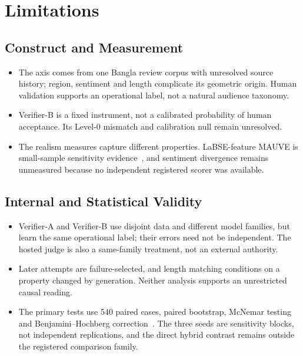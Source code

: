 \section{Limitations}
\label{sec:ch7-limitations}

\subsection{Construct and Measurement}
\label{sec:ch7-construct-measurement}

\begin{itemize}
    \setlength{\itemsep}{2pt}
    \setlength{\parskip}{0pt}
    \setlength{\parsep}{0pt}
    \item The axis comes from one Bangla review corpus with unresolved source history; region, sentiment and length complicate its geometric origin. Human validation supports an operational label, not a natural audience taxonomy.
    \item Verifier-B is a fixed instrument, not a calibrated probability of human acceptance. Its Level-0 mismatch and calibration null remain unresolved.
    \item The realism measures capture different properties. LaBSE-feature MAUVE is small-sample sensitivity evidence~\citep{b55}, and sentiment divergence remains unmeasured because no independent registered scorer was available.
\end{itemize}

\subsection{Internal and Statistical Validity}
\label{sec:ch7-internal-statistical}

\begin{itemize}
    \setlength{\itemsep}{2pt}
    \setlength{\parskip}{0pt}
    \setlength{\parsep}{0pt}
    \item Verifier-A and Verifier-B use disjoint data and different model families, but learn the same operational label; their errors need not be independent. The hosted judge is also a same-family treatment, not an external authority.
    \item Later attempts are failure-selected, and length matching conditions on a property changed by generation. Neither analysis supports an unrestricted causal reading.
    \item The primary tests use 540 paired cases, paired bootstrap, McNemar testing and Benjamini--Hochberg correction~\citep{b49,b50}. The three seeds are sensitivity blocks, not independent replications, and the direct hybrid contrast remains outside the registered comparison family.
\end{itemize}

